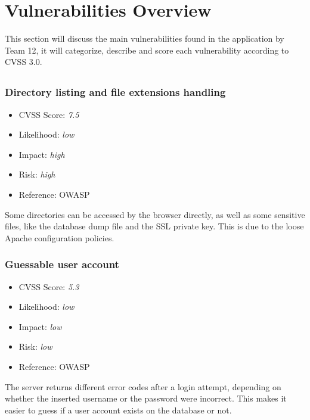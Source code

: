 \chapter{Vulnerabilities Overview}\label{chapter:vulnerabilities_overview}
This section will discuss the main vulnerabilities found in the \bs application by Team 12, it will categorize, describe and score each vulnerability according to CVSS 3.0.\newline

\section{\bs}
\subsection{Directory listing and file extensions handling} \label{over:vuln_1}
\begin{itemize}
	\item CVSS Score: \textit{7.5}
	\item Likelihood: \textit{low}
	\item Impact: \textit{high}
	\item Risk: \textit{high}
	\item Reference: OWASP 
\end{itemize}
Some directories can be accessed by the browser directly, as well as some sensitive files, like the database dump file and the SSL private key. This is due to the loose Apache configuration policies.

\subsection{Guessable user account} \label{over:vuln_2}
\begin{itemize}
	\item CVSS Score: \textit{5.3}
	\item Likelihood: \textit{low}
	\item Impact: \textit{low}
	\item Risk: \textit{low}
	\item Reference: OWASP 
\end{itemize}
The server returns different error codes after a login attempt, depending on whether the inserted username or the password were incorrect. This makes it easier to guess if a user account exists on the database or not.

